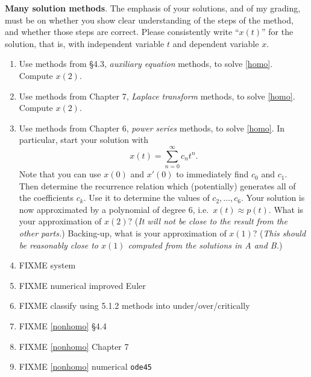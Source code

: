 \documentclass[12pt]{article}
\theoremstyle{definition}
\begin{document}
\medskip
\textbf{Many solution methods}.  The emphasis of your solutions, and of my grading, must be on whether you show clear understanding of the steps of the method, and whether those steps are correct.  Please consistently write ``$x(t)$'' for the solution, that is, with independent variable $t$ and dependent variable $x$.

\renewcommand{\labelenumi}{\Alph{enumi}.}
\begin{enumerate}
\item Use methods from \S4.3, \emph{auxiliary equation} methods, to solve \eqref{homo}.  Compute $x(2)$.
\item Use methods from Chapter 7, \emph{Laplace transform} methods, to solve \eqref{homo}.  Compute $x(2)$.
\item Use methods from Chapter 6, \emph{power series} methods, to solve \eqref{homo}.  In particular, start your solution with
    $$x(t) = \sum_{n=0}^\infty c_n t^n.$$
Note that you can use $x(0)$ and $x'(0)$ to immediately find $c_0$ and $c_1$.  Then determine the recurrence relation which (potentially) generates all of the coefficients $c_k$.  Use it to determine the values of $c_2,\dots,c_6$.  Your solution is now approximated by a polynomial of degree 6, i.e.~$x(t)\approx p(t)$.  What is your approximation of $x(2)$?  (\emph{It will not be close to the result from the other parts.})  Backing-up, what is your approximation of $x(1)$?  (\emph{This should be reasonably close to $x(1)$ computed from the solutions in A and B.})
\item FIXME system
\item FIXME numerical improved Euler
\item FIXME classify using 5.1.2 methods into under/over/critically
\item FIXME \eqref{nonhomo} \S4.4
\item FIXME \eqref{nonhomo} Chapter 7
\item FIXME \eqref{nonhomo} numerical \texttt{ode45}
\end{enumerate}
\end{document}
